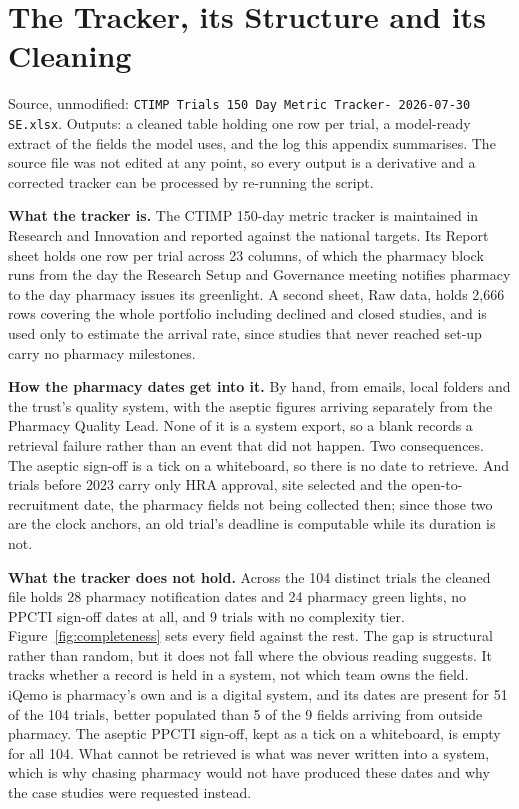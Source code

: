 
\chapter{The Tracker, its Structure and its Cleaning}
\label{app:tracker}

Source, unmodified: \texttt{CTIMP Trials 150 Day Metric Tracker- 2026-07-30 SE.xlsx}. Outputs: a cleaned table holding one row per trial, a model-ready extract of the fields the model uses, and the log this appendix summarises. The source file was not edited at any point, so every output is a derivative and a corrected tracker can be processed by re-running the script.

\textbf{What the tracker is.} The CTIMP 150-day metric tracker is maintained in Research and Innovation and reported against the national targets. Its Report sheet holds one row per trial across 23 columns, of which the pharmacy block runs from the day the Research Setup and Governance meeting notifies pharmacy to the day pharmacy issues its greenlight. A second sheet, Raw data, holds 2,666 rows covering the whole portfolio including declined and closed studies, and is used only to estimate the arrival rate, since studies that never reached set-up carry no pharmacy milestones.

\textbf{How the pharmacy dates get into it.} By hand, from emails, local folders and the trust's quality system, with the aseptic figures arriving separately from the Pharmacy Quality Lead. None of it is a system export, so a blank records a retrieval failure rather than an event that did not happen. Two consequences. The aseptic sign-off is a tick on a whiteboard, so there is no date to retrieve. And trials before 2023 carry only HRA approval, site selected and the open-to-recruitment date, the pharmacy fields not being collected then; since those two are the clock anchors, an old trial's deadline is computable while its duration is not.

\textbf{What the tracker does not hold.} Across the 104 distinct trials the cleaned file holds 28 pharmacy notification dates and 24 pharmacy green lights, no PPCTI sign-off dates at all, and 9 trials with no complexity tier. Figure~\ref{fig:completeness} sets every field against the rest. The gap is structural rather than random, but it does not fall where the obvious reading suggests. It tracks whether a record is held in a system, not which team owns the field. iQemo is pharmacy's own and is a digital system, and its dates are present for 51 of the 104 trials, better populated than 5 of the 9 fields arriving from outside pharmacy. The aseptic PPCTI sign-off, kept as a tick on a whiteboard, is empty for all 104. What cannot be retrieved is what was never written into a system, which is why chasing pharmacy would not have produced these dates and why the case studies were requested instead.

